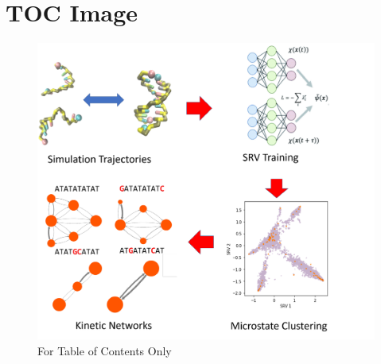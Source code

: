 \documentclass[journal=jpcbfk,manuscript=article]{achemso}
\begin{document}
\clearpage
\newpage

%




\clearpage
\newpage

\section*{TOC Image}

\begin{figure}[ht!]
	\begin{center} 
        \includegraphics[width=150mm, scale=1]{TOC.pdf}
        \caption*{For Table of Contents Only}
        \label{fig:TOC}
	\end{center}
\end{figure}
\end{document}
